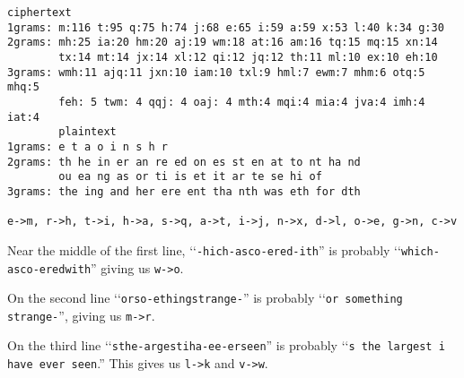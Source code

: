 \begin{Verbatim}[frame=single,fontsize=\tiny]
ciphertext
1grams: m:116 t:95 q:75 h:74 j:68 e:65 i:59 a:59 x:53 l:40 k:34 g:30
2grams: mh:25 ia:20 hm:20 aj:19 wm:18 at:16 am:16 tq:15 mq:15 xn:14
        tx:14 mt:14 jx:14 xl:12 qi:12 jq:12 th:11 ml:10 ex:10 eh:10
3grams: wmh:11 ajq:11 jxn:10 iam:10 txl:9 hml:7 ewm:7 mhm:6 otq:5 mhq:5
        feh: 5 twm: 4 qqj: 4 oaj: 4 mth:4 mqi:4 mia:4 jva:4 imh:4 iat:4
        plaintext
1grams: e t a o i n s h r
2grams: th he in er an re ed on es st en at to nt ha nd
        ou ea ng as or ti is et it ar te se hi of
3grams: the ing and her ere ent tha nth was eth for dth

e->m, r->h, t->i, h->a, s->q, a->t, i->j, n->x, d->l, o->e, g->n, c->v
\end{Verbatim}

Near the middle of the first line,
\lq\lq\verb!-hich-asco-ered-ith!''
is probably
\lq\lq\verb!which-asco-eredwith!''
giving us \verb!w->o!.

On the second line
\lq\lq\verb!orso-ethingstrange-!'' is probably
\lq\lq\verb!or something strange-!'',
giving us \verb!m->r!.

On the third line
\lq\lq\verb!sthe-argestiha-ee-erseen!''
is probably
\lq\lq\texttt{s the largest i have ever seen}.''
This gives us \verb!l->k! and \verb!v->w!.

